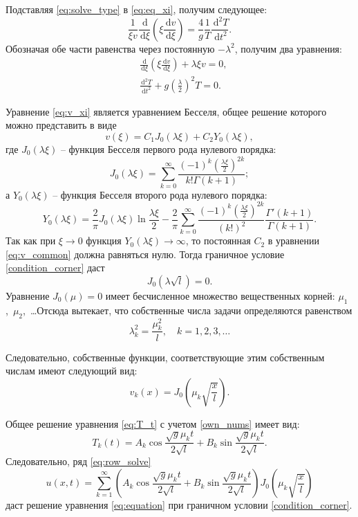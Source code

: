 \documentclass[a4paper, 14pt]{extarticle}
\renewcommand{\d}{\,\mathrm{d}}
\newcommand{\der}[2]{\frac{\d #1}{\d #2}}
\newcommand{\dder}[2]{\frac{\d^2 #1}{\d #2^2}}
\begin{document}
Подставляя \eqref{eq:solve_type} в \eqref{eq:eq_xi}, получим следующее:
\[
    \frac{1}{\xi v}\der{}{\xi}\left(\xi\der{v}{\xi}\right) = \frac{4}{g}\frac{1}{T}\dder{T}{t}.
\]
Обозначая обе части равенства через постоянную \( -\lambda^2 \), получим два
уравнения:
\begin{align}
    & \der{}{\xi}\left(\xi\der{v}{\xi}\right) + \lambda\xi v = 0, \label{eq:v_xi} \\
    & \dder{T}{t} + g\left(\frac{\lambda}{2}\right)^2T = 0. \label{eq:T_t}
\end{align}

Уравнение \eqref{eq:v_xi} является уравнением Бесселя, общее решение которого
можно представить в виде
\begin{equation}
    v(\xi) = C_1J_0(\lambda\xi) + C_2Y_0(\lambda\xi),
    \label{eq:v_common}
\end{equation}
где \( J_0(\lambda\xi) \) -- функция Бесселя первого рода нулевого порядка:
\[
    J_0(\lambda\xi) =
    \sum\limits_{k = 0}^\infty \frac{(-1)^k\left(\frac{\lambda\xi}{2}\right)^{2k}}
    {k!\Gamma(k + 1)};
\]
а \( Y_0(\lambda\xi) \) -- функция Бесселя второго рода нулевого порядка:
\[
    Y_0(\lambda\xi) = \frac{2}{\pi}J_0(\lambda\xi)\ln\frac{\lambda\xi}{2} - \frac{2}{\pi}
    \sum\limits_{k = 0}^\infty \frac{(-1)^k\left(\frac{\lambda\xi}{2}\right)^{2k}}{(k!)^2}
    \frac{\Gamma'(k+1)}{\Gamma(k+1)}.
\]
Так как при \( \xi \to 0 \) функция \( Y_0(\lambda\xi) \to \infty \), то постоянная \( C_2 \) в
уравнении \eqref{eq:v_common} должна равняться нулю. Тогда граничное условие
\eqref{condition_corner} даст
\[
    J_0(\lambda\sqrt{l}) = 0.
\]
Уравнение \( J_0(\mu) = 0 \) имеет бесчисленное множество вещественных корней:
\( \mu_1 \),~\( \mu_2 \),~\ldots Отсюда вытекает, что собственные числа задачи
определяются равенством
\begin{equation}
    \lambda_k^2 = \frac{\mu_k^2}{l}, \hspace{1em} k = 1, 2, 3, \ldots
    \label{own_nums}
\end{equation}

Следовательно, собственные функции, соответствующие этим собственным числам
имеют следующий вид:
\[
    v_k(x) = J_0\left(\mu_k\sqrt{\frac{x}{l}}\right).
\]

Общее решение уравнения \eqref{eq:T_t} с учетом \eqref{own_nums} имеет вид:
\[
    T_k(t) = A_k\cos\frac{\sqrt{g}\mu_kt}{2\sqrt{l}} + B_k\sin\frac{\sqrt{g}\mu_kt}{2\sqrt{l}}.
\]
Следовательно, ряд \eqref{eq:row_solve}
\begin{equation}
    u(x, t) = \sum\limits_{k = 1}^\infty \left(A_k\cos\frac{\sqrt{g}\mu_kt}{2\sqrt{l}} +
    B_k\sin\frac{\sqrt{g}\mu_kt}{2\sqrt{l}}\right)J_0\left(\mu_k\sqrt{\frac{x}{l}}\right)
    \label{eq:row_solve}
\end{equation}
даст решение уравнения \eqref{eq:equation} при граничном условии
\eqref{condition_corner}.
\end{document}
